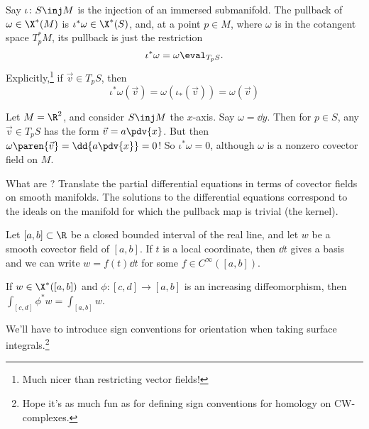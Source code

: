 \begin{prop}
    Say $\iota \colon S \inj M$ is the injection of an immersed submanifold. The pullback of $\omega \in \X^*(M)$ is $\iota^* \omega \in \X^*(S)$, and, at a point $p \in M$, where $\omega$ is in the cotangent space $T_p^*M$, its pullback is just the restriction
    \begin{equation*}
      \iota^* \omega = \omega\eval_{T_p S}.
    \end{equation*}
Explicitly,\footnote{Much nicer than restricting vector fields!}
if $\vec v \in T_p S$, then 
\begin{equation*}\iota^* \omega(\vec v) = \omega(\iota_*(\vec v)) = \omega(\vec v)\end{equation*}
\end{prop}


\begin{ex}[]
    Let $M = \R^2$, and consider $S \inj M$ the $x$-axis. 
    Say $\omega = \dd{y}$. 
    Then for $p \in S$, any $\vec v \in T_p S$ has the form $\vec v = a \pdv{x}$. 
    But then $\omega \paren{\vec v} = \dd{a \pdv{x} } = 0$! 
    So $\iota^* \omega = 0$, although $\omega$ is a nonzero covector field on $M$.
\end{ex}

\begin{note}[]
    What are ? Translate the partial differential equations in terms of covector fields on smooth manifolds. The solutions to the differential equations correspond to the ideals on the manifold for which the pullback map is trivial (the kernel).
\end{note}

\begin{ex}
    Let $[a,b] \subset \R$ be a closed bounded interval of the real line, and let $w$ be a smooth covector field of $[a,b]$. If $t$ is a local coordinate, then $\dd{t}$ gives a basis and we can write $w = f(t)\dd{t}$ for some $f \in C^\infty([a,b])$.
\end{ex}

\begin{prop}[]
    \label{welldefd}
    If $w \in \X^*([a,b])$ and $\phi \colon [c,d] \to [a,b]$ is an increasing diffeomorphism, then $\int_{[c,d]} \phi^* w = \int_{[a,b]} w$.
\end{prop}

We'll have to introduce sign conventions for orientation when taking surface integrals.\footnote{Hope it's as much fun as for defining sign conventions for homology on CW-complexes.}

